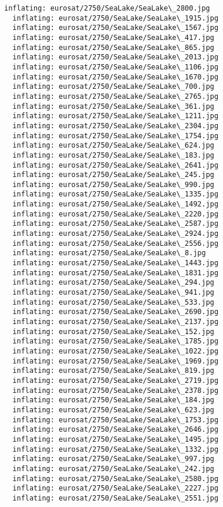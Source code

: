 \documentclass[11pt]{article}
\begin{document}
\begin{Verbatim}[commandchars=\\\{\}]
  inflating: eurosat/2750/SeaLake/SeaLake\_2800.jpg
  inflating: eurosat/2750/SeaLake/SeaLake\_1915.jpg
  inflating: eurosat/2750/SeaLake/SeaLake\_1567.jpg
  inflating: eurosat/2750/SeaLake/SeaLake\_417.jpg
  inflating: eurosat/2750/SeaLake/SeaLake\_865.jpg
  inflating: eurosat/2750/SeaLake/SeaLake\_2013.jpg
  inflating: eurosat/2750/SeaLake/SeaLake\_1106.jpg
  inflating: eurosat/2750/SeaLake/SeaLake\_1670.jpg
  inflating: eurosat/2750/SeaLake/SeaLake\_700.jpg
  inflating: eurosat/2750/SeaLake/SeaLake\_2765.jpg
  inflating: eurosat/2750/SeaLake/SeaLake\_361.jpg
  inflating: eurosat/2750/SeaLake/SeaLake\_1211.jpg
  inflating: eurosat/2750/SeaLake/SeaLake\_2304.jpg
  inflating: eurosat/2750/SeaLake/SeaLake\_1754.jpg
  inflating: eurosat/2750/SeaLake/SeaLake\_624.jpg
  inflating: eurosat/2750/SeaLake/SeaLake\_183.jpg
  inflating: eurosat/2750/SeaLake/SeaLake\_2641.jpg
  inflating: eurosat/2750/SeaLake/SeaLake\_245.jpg
  inflating: eurosat/2750/SeaLake/SeaLake\_990.jpg
  inflating: eurosat/2750/SeaLake/SeaLake\_1335.jpg
  inflating: eurosat/2750/SeaLake/SeaLake\_1492.jpg
  inflating: eurosat/2750/SeaLake/SeaLake\_2220.jpg
  inflating: eurosat/2750/SeaLake/SeaLake\_2587.jpg
  inflating: eurosat/2750/SeaLake/SeaLake\_2924.jpg
  inflating: eurosat/2750/SeaLake/SeaLake\_2556.jpg
  inflating: eurosat/2750/SeaLake/SeaLake\_8.jpg
  inflating: eurosat/2750/SeaLake/SeaLake\_1443.jpg
  inflating: eurosat/2750/SeaLake/SeaLake\_1831.jpg
  inflating: eurosat/2750/SeaLake/SeaLake\_294.jpg
  inflating: eurosat/2750/SeaLake/SeaLake\_941.jpg
  inflating: eurosat/2750/SeaLake/SeaLake\_533.jpg
  inflating: eurosat/2750/SeaLake/SeaLake\_2690.jpg
  inflating: eurosat/2750/SeaLake/SeaLake\_2137.jpg
  inflating: eurosat/2750/SeaLake/SeaLake\_152.jpg
  inflating: eurosat/2750/SeaLake/SeaLake\_1785.jpg
  inflating: eurosat/2750/SeaLake/SeaLake\_1022.jpg
  inflating: eurosat/2750/SeaLake/SeaLake\_1969.jpg
  inflating: eurosat/2750/SeaLake/SeaLake\_819.jpg
  inflating: eurosat/2750/SeaLake/SeaLake\_2719.jpg
  inflating: eurosat/2750/SeaLake/SeaLake\_2378.jpg
  inflating: eurosat/2750/SeaLake/SeaLake\_184.jpg
  inflating: eurosat/2750/SeaLake/SeaLake\_623.jpg
  inflating: eurosat/2750/SeaLake/SeaLake\_1753.jpg
  inflating: eurosat/2750/SeaLake/SeaLake\_2646.jpg
  inflating: eurosat/2750/SeaLake/SeaLake\_1495.jpg
  inflating: eurosat/2750/SeaLake/SeaLake\_1332.jpg
  inflating: eurosat/2750/SeaLake/SeaLake\_997.jpg
  inflating: eurosat/2750/SeaLake/SeaLake\_242.jpg
  inflating: eurosat/2750/SeaLake/SeaLake\_2580.jpg
  inflating: eurosat/2750/SeaLake/SeaLake\_2227.jpg
  inflating: eurosat/2750/SeaLake/SeaLake\_2551.jpg

\end{Verbatim}
\end{document}
